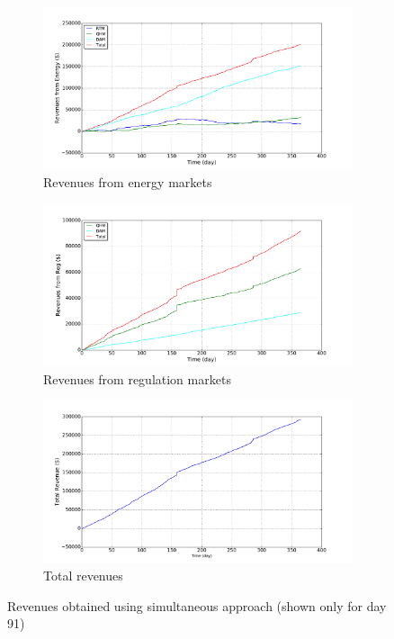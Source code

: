 \documentclass[11pt,twoside]{article}
\begin{document}
\begin{figure}[h!tp]
\centering
\begin{subfigure}[b]{0.49\textwidth} \includegraphics[width=\textwidth]{Figures/Plots/Simultaneous/E_Rev.pdf} \caption{Revenues from energy markets}\label{erevsim} \end{subfigure} \hfill
\begin{subfigure}[b]{0.49\textwidth} \includegraphics[width=\textwidth]{Figures/Plots/Simultaneous/Reg_Rev.pdf} \caption{Revenues from regulation markets}\label{regrevsim} \end{subfigure} \hfill
\begin{subfigure}[b]{0.49\textwidth} \includegraphics[width=\textwidth]{Figures/Plots/Simultaneous/Tot_Rev.pdf} \caption{Total revenues}\label{totrevsim}\end{subfigure} \hfill
\caption{Revenues obtained using simultaneous approach (shown only for day 91)}\label{revsim}
\end{figure}
\end{document}
